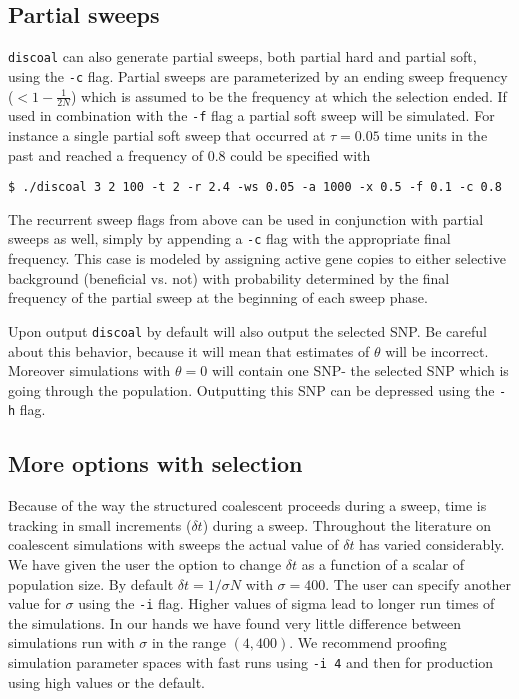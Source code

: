 \documentclass[12pt]{article}
\begin{document}
\subsection*{Partial sweeps}
\texttt{discoal} can also generate partial sweeps, both partial hard and partial soft, using the \texttt{-c} flag. Partial sweeps are parameterized by an ending sweep frequency ($< 1-\frac{1}{2N}$) which is assumed to be the frequency at which the selection ended. If used in combination with the \texttt{-f} flag a partial soft sweep will be simulated. For instance a single partial soft sweep that occurred at $\tau=0.05$ time units in the past and reached a frequency of $0.8$ could be specified with
\begin{verbatim}
$ ./discoal 3 2 100 -t 2 -r 2.4 -ws 0.05 -a 1000 -x 0.5 -f 0.1 -c 0.8
\end{verbatim}

The recurrent sweep flags from above can be used in conjunction with partial sweeps as well, simply by appending a \texttt{-c} flag with the appropriate final frequency. This case is modeled by assigning active gene copies to either selective background (beneficial vs. not) with probability determined by the final frequency of the partial sweep at the beginning of each sweep phase. 

Upon output \texttt{discoal} by default will also output the selected SNP. Be careful about this behavior, because it will mean that estimates of $\theta$ will be incorrect. Moreover simulations with $\theta=0$ will contain one SNP- the selected SNP which is going through the population. Outputting this SNP can be depressed using the \texttt{-h} flag.


\subsection*{More options with selection}
Because of the way the structured coalescent proceeds during a sweep, time is tracking in small increments ($\delta t$) during a sweep. Throughout the literature on coalescent simulations with sweeps the actual value of $\delta t$ has varied considerably. We have given the user the option to change $\delta t$ as a function of a scalar of population size. By default $\delta t = 1/\sigma N$ with $\sigma=400$. The user can specify another value for $\sigma$ using the \texttt{-i} flag. Higher values of sigma lead to longer run times of the simulations. In our hands we have found very little difference between simulations run with $\sigma$ in the range $(4,400)$. We recommend proofing simulation parameter spaces with fast runs using \texttt{-i 4} and then for production using high values or the default.  
\end{document}
